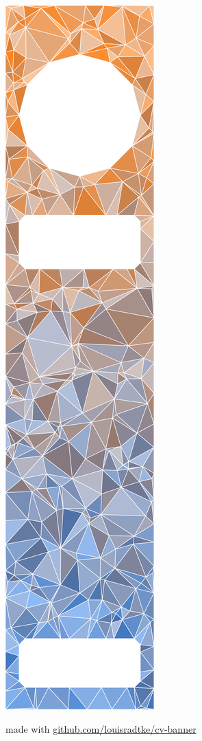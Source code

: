 \documentclass[a4paper,11pt]{article}
\newcommand{\col}[2]{\textcolor[HTML]{#1}{#2}}
\begin{document}
\noindent
\begin{minipage}[t]{0.3106\textwidth}
    \clearpage  %
    \vspace{-0.45cm}
    \includegraphics[width=\textwidth]{triangles.pdf}
    \begin{center}
    \tiny \col{316dbc}{made with \href{https://github.com/louisradtke/cv-banner}{github.com/louisradtke/cv-banner}}
    \end{center}


\end{minipage}
\end{document}
